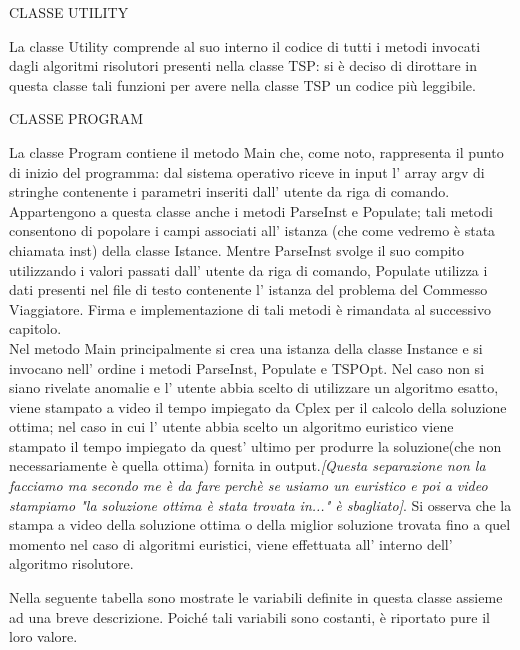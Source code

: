 \documentclass[11pt]{article}
\begin{document}
\vspace{2\baselineskip}
CLASSE UTILITY
\vspace{2\baselineskip}

La classe Utility comprende al suo interno il codice di tutti i metodi invocati dagli algoritmi risolutori presenti nella classe TSP: si \`e deciso di dirottare in questa classe tali funzioni per avere nella classe TSP un codice pi\`u leggibile.

\vspace{2\baselineskip}

CLASSE PROGRAM

\vspace{2\baselineskip}

La classe Program contiene il metodo Main che, come noto, rappresenta il punto di inizio del programma: dal sistema operativo riceve in input l' array argv di stringhe contenente i parametri inseriti dall' utente da riga di comando. Appartengono a questa classe anche i metodi ParseInst e Populate; tali metodi consentono di popolare i campi associati all' istanza (che come vedremo \`e stata chiamata inst) della classe Istance. Mentre ParseInst svolge il suo compito utilizzando i valori passati dall' utente da riga di comando, Populate utilizza i dati presenti nel file di testo contenente l' istanza del problema del Commesso Viaggiatore. Firma e implementazione di tali metodi \`e rimandata al successivo capitolo.\\
Nel metodo Main  principalmente si crea una istanza della classe Instance e si invocano nell' ordine i metodi ParseInst, Populate e TSPOpt. Nel caso non si siano rivelate anomalie e l' utente abbia scelto di utilizzare un algoritmo esatto, viene stampato a video il tempo impiegato da Cplex per il calcolo della soluzione ottima; nel caso in cui l' utente abbia scelto un algoritmo euristico viene stampato il tempo impiegato da quest' ultimo per produrre la soluzione(che non necessariamente \`e quella ottima) fornita in output.\textit{[Questa separazione non la facciamo ma secondo me \`e da fare perch\`e se usiamo un euristico e poi a video stampiamo "la soluzione ottima \`e stata trovata in..." \`e sbagliato]}. Si osserva che la stampa a video della soluzione ottima o della miglior soluzione trovata fino a quel momento nel caso di algoritmi euristici, viene effettuata all' interno dell' algoritmo risolutore.

Nella seguente tabella sono mostrate le variabili definite in questa classe assieme ad una breve descrizione. Poich\'e tali variabili sono costanti, \`e riportato pure il loro valore. 
\end{document}
